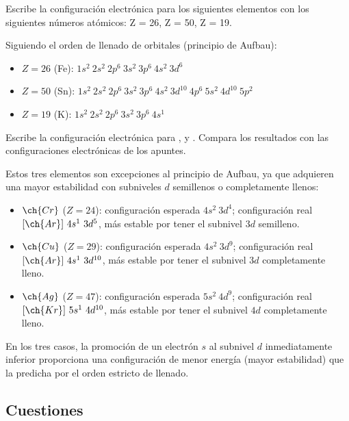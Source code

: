 \begin{exercise}
    Escribe la configuración electrónica para los siguientes elementos con los siguientes números atómicos: Z = 26, Z = 50, Z = 19.
    \begin{solu}
        Siguiendo el orden de llenado de orbitales (principio de Aufbau):
        \begin{itemize}
            \item \(Z=26\) (Fe): \(1s^2\ 2s^2\ 2p^6\ 3s^2\ 3p^6\ 4s^2\ 3d^6\)
            \item \(Z=50\) (Sn): \(1s^2\ 2s^2\ 2p^6\ 3s^2\ 3p^6\ 4s^2\ 3d^{10}\ 4p^6\ 5s^2\ 4d^{10}\ 5p^2\)
            \item \(Z=19\) (K): \(1s^2\ 2s^2\ 2p^6\ 3s^2\ 3p^6\ 4s^1\)
        \end{itemize}
    \end{solu}
\end{exercise}

\begin{exercise}
    Escribe la configuración electrónica para ,  y .
    Compara los resultados con las configuraciones electrónicas de los apuntes.
    \begin{solu}
        Estos tres elementos son excepciones al principio de Aufbau, ya que adquieren una mayor estabilidad con subniveles \(d\) semillenos o completamente llenos:
        \begin{itemize}
            \item \(\ch{Cr}\) (\(Z=24\)): configuración esperada \(4s^2\ 3d^4\); configuración real \([\ch{Ar}]\ 4s^1\ 3d^5\), más estable por tener el subnivel \(3d\) semilleno.
            \item \(\ch{Cu}\) (\(Z=29\)): configuración esperada \(4s^2\ 3d^9\); configuración real \([\ch{Ar}]\ 4s^1\ 3d^{10}\), más estable por tener el subnivel \(3d\) completamente lleno.
            \item \(\ch{Ag}\) (\(Z=47\)): configuración esperada \(5s^2\ 4d^9\); configuración real \([\ch{Kr}]\ 5s^1\ 4d^{10}\), más estable por tener el subnivel \(4d\) completamente lleno.
        \end{itemize}
        En los tres casos, la promoción de un electrón \(s\) al subnivel \(d\) inmediatamente inferior proporciona una configuración de menor energía (mayor estabilidad) que la predicha por el orden estricto de llenado.
    \end{solu}
\end{exercise}

\subsection{Cuestiones}

